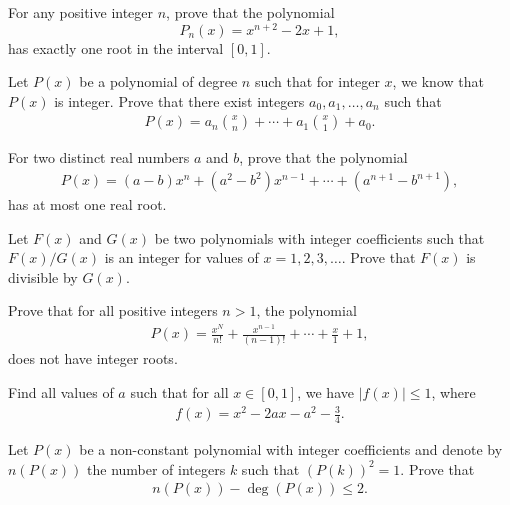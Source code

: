 \begin{question}
    For any positive integer $n$, prove that the polynomial \[P_n(x)=x^{n+2}-2x+1,\] has exactly one root in the interval $[0,1]$.
\end{question}


\begin{question}[name={1999 Iran}]
    Let $P(x)$ be a polynomial of degree $n$ such that for integer $x$, we know that $P(x)$ is integer. Prove that there exist integers $a_0,a_1,\dots,a_n$ such that
    \begin{align*}
        P(x)=a_n\binom{x}{n}+\cdots+a_1\binom{x}{1} + a_0.
    \end{align*}
\end{question}


\begin{question}
    For two distinct real numbers $a$ and $b$, prove that the polynomial
    \begin{align*}
        P(x)=(a-b)x^n + (a^2-b^2)x^{n-1} + \cdots + (a^{n+1} - b^{n+1}),
    \end{align*}
    has at most one real root.
\end{question}


\begin{question}[name={1995 Iran First Round}]
    Let $F(x)$ and $G(x)$ be two polynomials with integer coefficients such that $F(x)/G(x)$ is an integer for values of $x=1,2,3,\dots$. Prove that $F(x)$ is divisible by $G(x)$.
\end{question}


\begin{question}[name={1989 Iran Second Round}]
    Prove that for all positive integers $n>1$, the polynomial
    \begin{align*}
        P(x)= \frac{x^N}{n!} + \frac{x^{n-1}}{(n-1)!} + \cdots + \frac{x}{1} + 1,
    \end{align*}
    does not have integer roots.
\end{question}


\begin{question}[name={1997 Bulgaria}]
    Find all values of $a$ such that for all $x\in [0,1]$, we have $|f(x)|\leq 1$, where
    \begin{align*}
        f(x) = x^2 - 2ax - a^2 - \frac{3}{4}.
    \end{align*}
\end{question}


\begin{question}[name={1974 International Mathematics Olympiad}]
    Let $P(x)$ be a non-constant polynomial with integer coefficients and denote by $n(P(x))$ the number of integers $k$ such that $(P(k))^2=1$. Prove that
    \begin{align*}
        n(P(x)) - \deg(P(x)) \leq 2.
    \end{align*}
\end{question}

